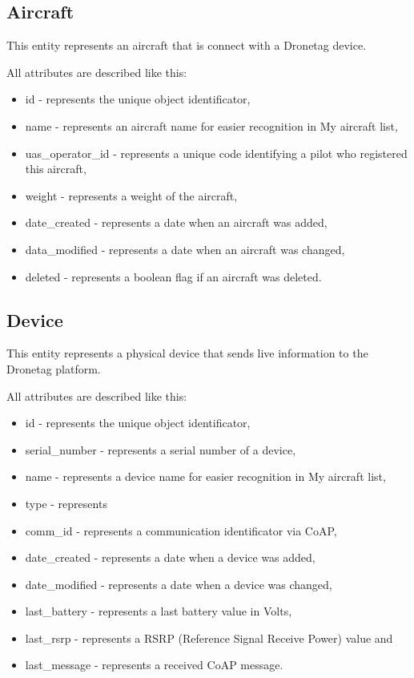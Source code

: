 \subsection{Aircraft}\label{subsec:aircraft}
This entity represents an aircraft that is connect with a Dronetag device.

All attributes are described like this:
\begin{itemize}
    \item id - represents the unique object identificator,
    \item name - represents an aircraft name for easier recognition in My aircraft list,
    \item uas\_operator\_id - represents a unique code identifying a pilot who registered this aircraft,
    \item weight - represents a weight of the aircraft,
    \item date\_created - represents a date when an aircraft was added,
    \item data\_modified - represents a date when an aircraft was changed,
    \item deleted - represents a boolean flag if an aircraft was deleted.
\end{itemize}

\subsection{Device}\label{subsec:device}
This entity represents a physical device that sends live information to the Dronetag platform.

All attributes are described like this:
\begin{itemize}
    \item id - represents the unique object identificator,
    \item serial\_number - represents a serial number of a device,
    \item name - represents a device name for easier recognition in My aircraft list,
    \item type - represents
    \item comm\_id - represents a communication identificator via CoAP,
    \item date\_created - represents a date when a device was added,
    \item date\_modified - represents a date when a device was changed,
    \item last\_battery - represents a last battery value in Volts,
    \item last\_rsrp - represents a RSRP (Reference Signal Receive Power) value and
    \item last\_message - represents a received CoAP message.
\end{itemize}

